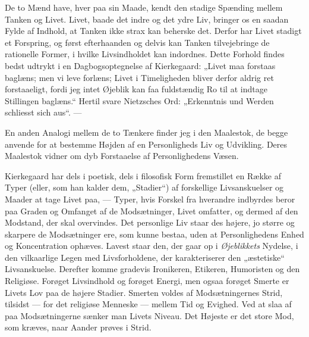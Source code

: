 \documentclass[12pt,a4paper,openany]{book}
\newcommand{\opage}[1]{\marginnote{\footnotesize\textit{[#1]}}}
\begin{document}
De to Mænd have, hver paa sin Maade, kendt den stadige
Spænding mellem Tanken og Livet. Livet, baade det indre og
det ydre Liv, bringer os en saadan Fylde af Indhold, at Tanken
ikke strax kan beherske det. Derfor har Livet stadigt et Forspring,
og først efterhaanden og delvis kan Tanken tilvejebringe
de rationelle Former, i hvilke Livsindholdet kan indordnes.
Dette Forhold findes bedst udtrykt i en Dagbogsoptegnelse af
Kierkegaard: „Livet maa forstaas baglæns; men vi leve forlæns;
Livet i Timeligheden bliver derfor aldrig ret forstaaeligt,
\setcounter{footnote}{0}%
\opage{192}fordi jeg intet Øjeblik kan faa fuldstændig Ro til at indtage
Stillingen baglæns.“ Hertil svare Nietzsches Ord: „Erkenntnis
und Werden schliesst sich aus“. ---

En anden Analogi mellem de to Tænkere finder jeg i den
Maalestok, de begge anvende for at bestemme Højden af en
Personligheds Liv og Udvikling. Deres Maalestok vidner om
dyb Forstaaelse af Personlighedens Væsen.

Kierkegaard har dels i poetisk, dels i filosofisk Form fremstillet
en Række af Typer (eller, som han kalder dem, „Stadier“)
af forskellige Livsanskuelser og Maader at tage Livet
paa, --- Typer, hvis Forskel fra hverandre indbyrdes beror paa
Graden og Omfanget af de Modsætninger, Livet omfatter, og
dermed af den Modstand, der skal overvindes. Det personlige
Liv staar des højere, jo større og skarpere de Modsætninger
ere, som kunne bestaa, uden at Personlighedens Enhed og Koncentration
ophæves. Lavest staar den, der gaar op i \textit{Øjeblikkets}
Nydelse, i den vilkaarlige Legen med Livsforholdene,
der karakteriserer den „æstetiske“ Livsanskuelse. Derefter
komme gradevis Ironikeren, Etikeren, Humoristen og den Religiøse.
Forøget Livsindhold og forøget Energi, men ogsaa forøget
Smerte er Livets Lov paa de højere Stadier. Smerten
voldes af Modsætningernes Strid, tilsidst --- for det religiøse
Menneske --- mellem Tid og Evighed. Ved at slaa af paa Modsætningerne
sænker man Livets Niveau. Det Højeste er det
store Mod, som kræves, naar Aander prøves i Strid.
\end{document}
